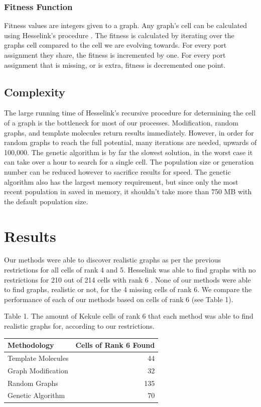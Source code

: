 \documentclass[12pt]{article}
\begin{document}
\subsubsection{Fitness Function}

Fitness values are integers given to a graph. Any graph's cell can be calculated using Hesselink's procedure \cite{H13}. The fitness is calculated by iterating over the graphs cell compared to the cell we are evolving towards. For every port assignment they share, the fitness is incremented by one. For every port assignment that is missing, or is extra, fitness is decremented one point. 

\subsection{Complexity}

The large running time of Hesselink's recursive procedure for determining the cell of a  graph is the bottleneck for most of our processes. Modification, random graphs, and template molecules return results immediately. However, in order for random graphs to reach the full potential, many iterations are needed, upwards of 100,000. The genetic algorithm is by far the slowest solution, in the worst case it can take over a hour to search for a single cell. The population size or generation number can be reduced however to sacrifice results for speed. The genetic algorithm also has the largest memory requirement, but since only the most recent population in saved in memory, it shouldn't take more than 750 MB with the default population size. 

\section{Results}

Our methods were able to discover realistic graphs as per the previous restrictions for all cells of rank 4 and 5. Hesselink was able to find graphs with no restrictions for 210 out of 214 cells with rank 6 \cite{H13}. None of our methods were able to find graphs, realistic or not, for the 4 missing cells of rank 6. We compare the performance of each of our methods based on cells of rank 6 (see Table 1).

Table 1. The amount of Kekule cells of rank 6 that each method was able to find realistic graphs for, according to our restrictions.
\begin{center}
  \begin{tabular}{ | l | r |}
    \hline
    Methodology & Cells of Rank 6 Found \\
    \hline
    Template Molecules & 44 \\
    Graph Modification & 32 \\
    Random Graphs & 135 \\
    Genetic Algorithm & 70 \\
    \hline
  \end{tabular}
\end{center}
\end{document}
